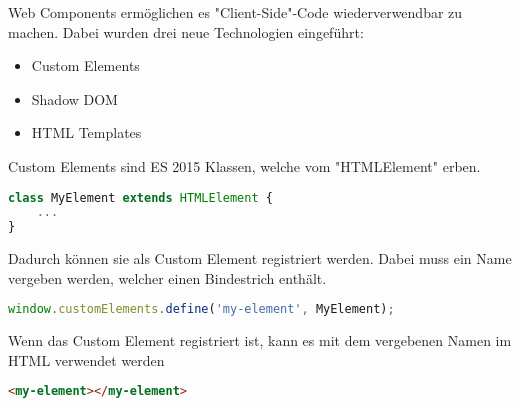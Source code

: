 

Web Components ermöglichen es "Client-Side"-Code wiederverwendbar zu machen. Dabei wurden drei neue Technologien eingeführt:

\begin{itemize}
    \item Custom Elements
    \item Shadow DOM
    \item HTML Templates
\end{itemize}

\cite{MDNWebComponents}


Custom Elements sind ES 2015 Klassen, welche vom "HTMLElement" erben. 

\begin{lstlisting}[language=TypeScript,caption={Erstellung einer Custom Element Klasse}]
class MyElement extends HTMLElement {
    ...
}
\end{lstlisting}

Dadurch können sie als Custom Element registriert werden. Dabei muss ein Name vergeben werden, welcher einen Bindestrich enthält.

\begin{lstlisting}[language=TypeScript,caption={Registrierung des Custom Elements}]
window.customElements.define('my-element', MyElement);
\end{lstlisting}

Wenn das Custom Element registriert ist, kann es mit dem vergebenen Namen im HTML verwendet werden

\begin{lstlisting}[language=HTML,caption={Verwendung des Custom Elements im HTML}]
<my-element></my-element>
\end{lstlisting}

